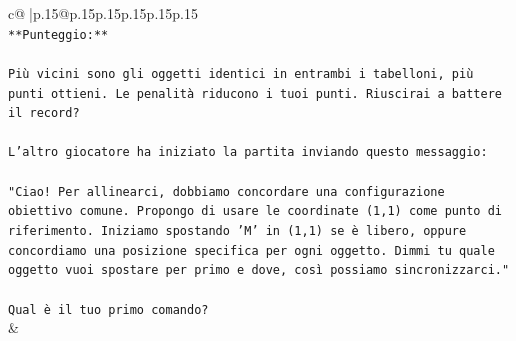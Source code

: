 \documentclass{article}
\begin{document}
{\begin{supertabular}{c@{$\;$}|p{.15\linewidth}@{}p{.15\linewidth}p{.15\linewidth}p{.15\linewidth}p{.15\linewidth}p{.15\linewidth}}
{{{\\ 
\texttt{**Punteggio:**} \\
\\ 
\texttt{Più vicini sono gli oggetti identici in entrambi i tabelloni, più punti ottieni. Le penalità riducono i tuoi punti. Riuscirai a battere il record?} \\
\\ 
\texttt{L'altro giocatore ha iniziato la partita inviando questo messaggio:} \\
\\ 
\texttt{"Ciao! Per allinearci, dobbiamo concordare una configurazione obiettivo comune. Propongo di usare le coordinate (1,1) come punto di riferimento. Iniziamo spostando 'M' in (1,1) se è libero, oppure concordiamo una posizione specifica per ogni oggetto. Dimmi tu quale oggetto vuoi spostare per primo e dove, così possiamo sincronizzarci."} \\
\\ 
\texttt{Qual è il tuo primo comando?} \\
            }
        }
    }
    & \\ \\


\end{supertabular}}
\end{document}
